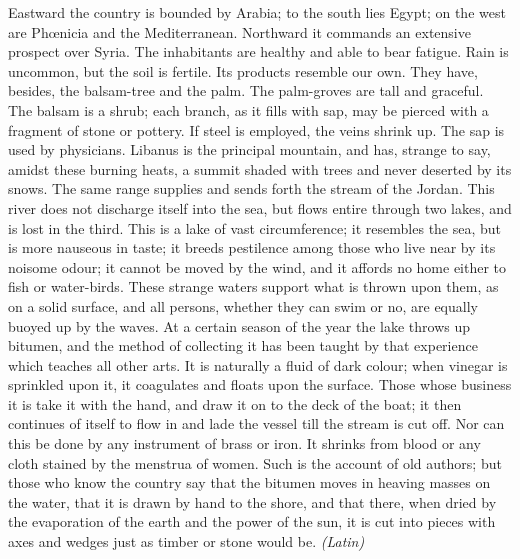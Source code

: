 Eastward the country is bounded by Arabia; to the south lies Egypt; on the west are Phœnicia and the Mediterranean. Northward it commands an extensive prospect over Syria. The inhabitants are healthy and able to bear fatigue. Rain is uncommon, but the soil is fertile. Its products resemble our own. They have, besides, the balsam-tree and the palm. The palm-groves are tall and graceful. The balsam is a shrub; each branch, as it fills with sap, may be pierced with a fragment of stone or pottery. If steel is employed, the veins shrink up. The sap is used by physicians. Libanus is the principal mountain, and has, strange to say, amidst these burning heats, a summit shaded with trees and never deserted by its snows. The same range supplies and sends forth the stream of the Jordan. This river does not discharge itself into the sea, but flows entire through two lakes, and is lost in the third. This is a lake of vast circumference; it resembles the sea, but is more nauseous in taste; it breeds pestilence among those who live near by its noisome odour; it cannot be moved by the wind, and it affords no home either to fish or water-birds. These strange waters support what is thrown upon them, as on a solid surface, and all persons, whether they can swim or no, are equally buoyed up by the waves. At a certain season of the year the lake throws up bitumen, and the method of collecting it has been taught by that experience which teaches all other arts. It is naturally a fluid of dark colour; when vinegar is sprinkled upon it, it coagulates and floats upon the surface. Those whose business it is take it with the hand, and draw it on to the deck of the boat; it then continues of itself to flow in and lade the vessel till the stream is cut off. Nor can this be done by any instrument of brass or iron. It shrinks from blood or any cloth stained by the menstrua of women. Such is the account of old authors; but those who know the country say that the bitumen moves in heaving masses on the water, that it is drawn by hand to the shore, and that there, when dried by the evaporation of the earth and the power of the sun, it is cut into pieces with axes and wedges just as timber or stone would be. \emph{(Latin)}


